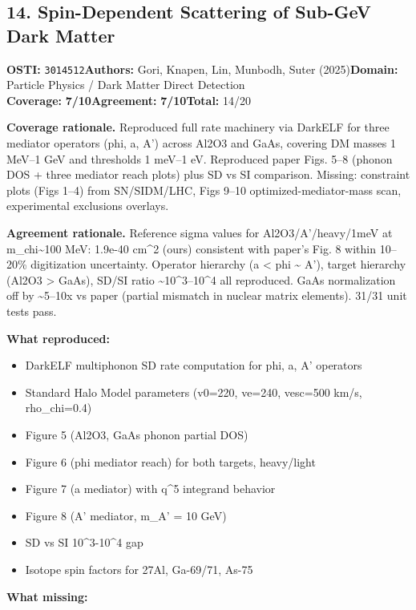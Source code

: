 \documentclass[11pt]{article}
\newcommand{\scorebadge}[2]{\textbf{#1:} \textbf{#2/10}}
\begin{document}
\subsection{14. Spin-Dependent Scattering of Sub-GeV Dark Matter}
\textbf{OSTI:} \texttt{3014512}\quad\textbf{Authors:} Gori, Knapen, Lin, Munbodh, Suter (2025)\quad\textbf{Domain:} Particle Physics / Dark Matter Direct Detection\\
\scorebadge{Coverage}{7}\quad\scorebadge{Agreement}{7}\quad\textbf{Total:} 14/20\par\smallskip
\noindent\textbf{Coverage rationale.} Reproduced full rate machinery via DarkELF for three mediator operators (phi, a, A') across Al2O3 and GaAs, covering DM masses 1 MeV--1 GeV and thresholds 1 meV--1 eV. Reproduced paper Figs. 5--8 (phonon DOS + three mediator reach plots) plus SD vs SI comparison. Missing: constraint plots (Figs 1--4) from SN/SIDM/LHC, Figs 9--10 optimized-mediator-mass scan, experimental exclusions overlays.\par
\noindent\textbf{Agreement rationale.} Reference sigma values for Al2O3/A'/heavy/1meV at m\_chi\textasciitilde{}100 MeV: 1.9e-40 cm\textasciicircum{}2 (ours) consistent with paper's Fig. 8 within 10--20\% digitization uncertainty. Operator hierarchy (a \textless{} phi \textasciitilde{} A'), target hierarchy (Al2O3 \textgreater{} GaAs), SD/SI ratio \textasciitilde{}10\textasciicircum{}3--10\textasciicircum{}4 all reproduced. GaAs normalization off by \textasciitilde{}5--10x vs paper (partial mismatch in nuclear matrix elements). 31/31 unit tests pass.\par\smallskip
\noindent\textbf{What reproduced:}
\begin{itemize}[leftmargin=1.4em,itemsep=0.2em,topsep=0.2em]
\item DarkELF multiphonon SD rate computation for phi, a, A' operators
\item Standard Halo Model parameters (v0=220, ve=240, vesc=500 km/s, rho\_chi=0.4)
\item Figure 5 (Al2O3, GaAs phonon partial DOS)
\item Figure 6 (phi mediator reach) for both targets, heavy/light
\item Figure 7 (a mediator) with q\textasciicircum{}5 integrand behavior
\item Figure 8 (A' mediator, m\_A' = 10 GeV)
\item SD vs SI 10\textasciicircum{}3-10\textasciicircum{}4 gap
\item Isotope spin factors for 27Al, Ga-69/71, As-75
\end{itemize}\noindent\textbf{What missing:}
\end{document}
